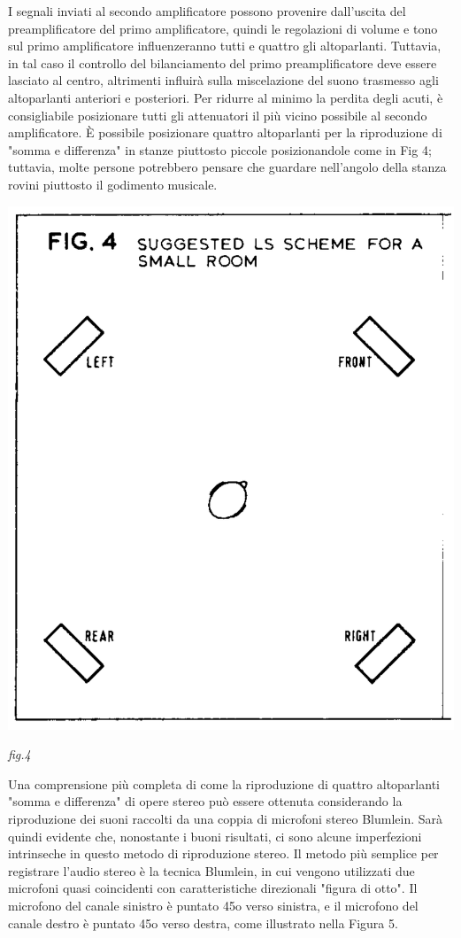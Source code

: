 \documentclass[11pt]{article}
\begin{document}
\begin{multicols*}{2}
I segnali inviati al secondo amplificatore possono provenire dall'uscita del preamplificatore del primo amplificatore, quindi le regolazioni di volume e tono sul primo amplificatore influenzeranno tutti e quattro gli altoparlanti. Tuttavia, in tal caso il controllo del bilanciamento del primo preamplificatore deve essere lasciato al centro, altrimenti influirà sulla miscelazione del suono trasmesso agli altoparlanti anteriori e posteriori. Per ridurre al minimo la perdita degli acuti, è consigliabile posizionare tutti gli attenuatori il più vicino possibile al secondo amplificatore. È possibile posizionare quattro altoparlanti per la riproduzione di "somma e differenza" in stanze piuttosto piccole posizionandole come in Fig 4; tuttavia, molte persone potrebbero pensare che guardare nell'angolo della stanza rovini piuttosto il godimento musicale. 

\begin{center}
\includegraphics[scale=0.4]{images/fig_04.png}

{\scriptsize \emph{fig.4}}
\end{center}


Una comprensione più completa di come la riproduzione di quattro altoparlanti "somma e differenza" di opere stereo può essere ottenuta considerando la riproduzione dei suoni raccolti da una coppia di microfoni stereo Blumlein. Sarà quindi evidente che, nonostante i buoni risultati, ci sono alcune imperfezioni intrinseche in questo metodo di riproduzione stereo. Il metodo più semplice per registrare l'audio stereo è la tecnica Blumlein, in cui vengono utilizzati due microfoni quasi coincidenti con caratteristiche direzionali "figura di otto". Il microfono del canale sinistro è puntato 45o verso sinistra, e il microfono del canale destro è puntato 45o verso destra, come illustrato nella Figura 5.


\end{multicols*}
\end{document}
